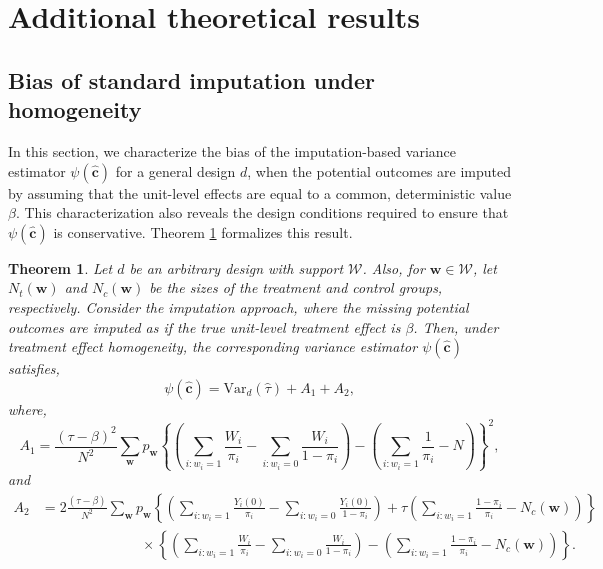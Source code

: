 \documentclass[12pt]{article}
\newcommand{\Var}{{\text{Var}}}
\newtheorem{theorem}{Theorem}[section]
\begin{document}
\setcounter{table}{0}
\renewcommand{\thetable}{A\arabic{table}}
\setcounter{figure}{0}
\renewcommand\thefigure{A\arabic{figure}}
\setcounter{theorem}{0}
\renewcommand\thetheorem{A\arabic{theorem}}
\setcounter{lemma}{0}
\renewcommand\thelemma{A\arabic{lemma}}
\setcounter{equation}{0}
\renewcommand\theequation{A\arabic{equation}}
\setcounter{corollary}{0}
\renewcommand\thecorollary{A\arabic{corollary}}




\section{Additional theoretical results}
\label{appsec_additional_theory}


\subsection{Bias of standard imputation under homogeneity}

In this section, we characterize the bias of the imputation-based variance estimator $\psi(\hat{\bm{c}})$ for a general design $d$, when the potential outcomes are imputed by assuming that the unit-level effects are equal to a common, deterministic value $\beta$. This characterization also reveals the design conditions required to ensure that $\psi(\hat{\bm{c}})$ is conservative. Theorem \ref{thm_impute_general} formalizes this result.
\begin{theorem} \normalfont
Let $d$ be an arbitrary design with support $\mathcal{W}$. Also, for $\bm{w} \in \mathcal{W}$, let $N_t(\bm{w})$ and $N_c(\bm{w})$ be the sizes of the treatment and control groups, respectively. 
Consider the imputation approach, where the missing potential outcomes are imputed as if the true unit-level treatment effect is $\beta$. Then, under treatment effect homogeneity, the corresponding variance estimator $\psi(\hat{\bm{c}})$ satisfies,
$$\psi(\hat{\bm{c}}) = \Var_d(\hat{\tau}) + A_1 + A_2,$$
where, 
$$A_1  = \frac{(\tau - \beta)^2}{N^2}\sum_{\bm{w}}p_{\bm{w}}\left\{\left(\sum_{i:w_i = 1}\frac{W_i}{\pi_i} - \sum_{i:w_i = 0}\frac{W_i}{1-\pi_i}\right) - \left(\sum_{i:w_i = 1}\frac{1}{\pi_i} - N \right)\right\}^2,$$
and 
\begin{align*}
  A_2 & =   2\frac{(\tau - \beta)}{N^2}\sum_{\bm{w}}p_{\bm{w}}\left\{ \left(\sum_{i:w_i = 1}\frac{Y_i(0)}{\pi_i} - \sum_{i:w_i = 0}\frac{Y_i(0)}{1-\pi_i} \right) + \tau \left( \sum_{i:w_i = 1}\frac{1-\pi_i}{\pi_i} - N_c(\bm{w}) \right) \right\} \nonumber \\
 & \hspace{3cm} \times \left\{\left(\sum_{i:w_i = 1}\frac{W_i}{\pi_i} - \sum_{i:w_i = 0}\frac{W_i}{1-\pi_i}\right) - \left(\sum_{i:w_i = 1}\frac{1-\pi_i}{\pi_i} - N_c(\bm{w}) \right)\right\}.
\end{align*} \label{thm_impute_general}
\end{theorem}
\end{document}
